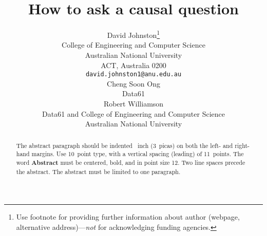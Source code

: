 \documentclass{article}
\title{How to ask a causal question}
\author{%
  David Johnston\thanks{Use footnote for providing further information
    about author (webpage, alternative address)---\emph{not} for acknowledging
    funding agencies.} \\
  College of Engineering and Computer Science\\
  Australian National University\\
  ACT, Australia 0200 \\
  \texttt{david.johnston1@anu.edu.au} \\
   \And
  Cheng Soon Ong\\
  Data61\\
   \AND
   Robert Williamson \\
   Data61 and College of Engineering and Computer Science\\
   Australian National University\\
}
\theoremstyle{plain}
\theoremstyle{definition}
\begin{document}
\maketitle

\begin{abstract}
  The abstract paragraph should be indented ~inch (3~picas) on
  both the left- and right-hand margins. Use 10~point type, with a vertical
  spacing (leading) of 11~points.  The word \textbf{Abstract} must be centered,
  bold, and in point size 12. Two line spaces precede the abstract. The abstract
  must be limited to one paragraph.
\end{abstract}






\end{document}

